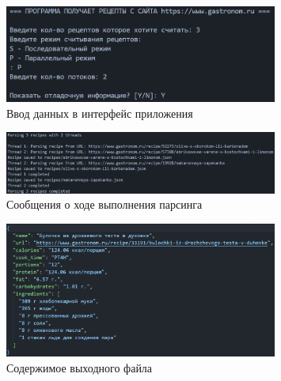 \begin{figure}[h]
	\centering
	\includegraphics[width=0.8\textwidth]{images/examples/pin.png}
	\caption{Ввод данных в интерфейс приложения}
	\label{fig:1-paral}
\end{figure}
\begin{figure}[h]
	\centering
	\includegraphics[width=0.8\textwidth]{images/examples/pout.png}
	\caption{Сообщения о ходе выполнения парсинга}
	\label{fig:2-paral}
\end{figure}

\begin{figure}[h]
	\centering
	\includegraphics[width=0.8\textwidth]{images/examples/file.png}
	\caption{Содержимое выходного файла}
	\label{fig:file}
\end{figure}